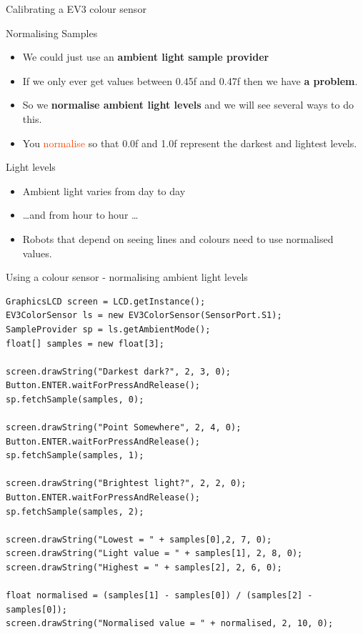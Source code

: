 \documentclass[color=pdftex,usenames,dvipsnames, aspectratio=169]{beamer}
\begin{document}
\begin{frame}{Calibrating a EV3 colour sensor}
\begin{block}{Normalising Samples}
\begin{itemize}
\item We could just use an \textbf{ambient light sample provider}
\item \textcolor{RedOrange}{If we  only ever get values between 0.45f and 0.47f then we have \textbf{a problem}.}
\item So we \textbf{normalise ambient light levels} and we will see several ways to do this.
\item You \textcolor{OrangeRed}{normalise} so that 0.0f and 1.0f represent the darkest and lightest levels.
\end{itemize}
\end{block}

\begin{block}{Light levels}

\begin{itemize}
\item Ambient light varies from day to day
\item \dots and from hour to hour \dots
\item Robots that depend on seeing lines and colours need to use normalised values.
\end{itemize}
\end{block}

\end{frame}


\begin{frame}{Using a colour sensor - normalising ambient light levels}
\begin{lstlisting}[basicstyle=\ttfamily\scriptsize\color{blue}]
GraphicsLCD screen = LCD.getInstance();
EV3ColorSensor ls = new EV3ColorSensor(SensorPort.S1);
SampleProvider sp = ls.getAmbientMode();
float[] samples = new float[3];

screen.drawString("Darkest dark?", 2, 3, 0); Button.ENTER.waitForPressAndRelease();
sp.fetchSample(samples, 0);

screen.drawString("Point Somewhere", 2, 4, 0); Button.ENTER.waitForPressAndRelease();
sp.fetchSample(samples, 1);

screen.drawString("Brightest light?", 2, 2, 0); Button.ENTER.waitForPressAndRelease();
sp.fetchSample(samples, 2);

screen.drawString("Lowest = " + samples[0],2, 7, 0);
screen.drawString("Light value = " + samples[1], 2, 8, 0);
screen.drawString("Highest = " + samples[2], 2, 6, 0);

float normalised = (samples[1] - samples[0]) / (samples[2] - samples[0]);
screen.drawString("Normalised value = " + normalised, 2, 10, 0);
\end{lstlisting}
\end{frame}
\end{document}
